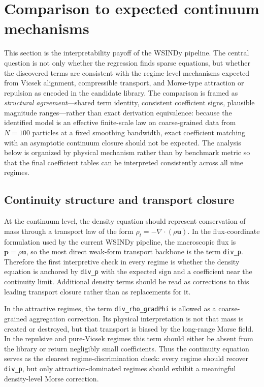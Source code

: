 \section{Comparison to expected continuum mechanisms}
\label{sec:continuum_comparison}

This section is the interpretability payoff of the WSINDy pipeline.  The
central question is not only whether the regression finds sparse equations, but
whether the discovered terms are consistent with the regime-level mechanisms
expected from Vicsek alignment, compressible transport, and Morse-type
attraction or repulsion as encoded in the candidate library.  The comparison
is framed as \emph{structural agreement}---shared term identity, consistent
coefficient signs, plausible magnitude ranges---rather than exact derivation
equivalence: because the identified model is an effective finite-scale law on
coarse-grained data from $N{=}100$ particles at a fixed smoothing bandwidth,
exact coefficient matching with an asymptotic continuum closure should not be
expected.
The analysis below is organized by physical mechanism rather than
by benchmark metric so that the final coefficient tables can be interpreted
consistently across all nine regimes.

\subsection{Continuity structure and transport closure}

At the continuum level, the density equation should represent conservation of
mass through a transport law of the form
$\rho_t = -\nabla\cdot(\rho \mathbf{u})$.
In the flux-coordinate formulation used by the current WSINDy pipeline, the
macroscopic flux is $\mathbf{p}=\rho\mathbf{u}$, so the most direct weak-form
transport backbone is the term \texttt{div\_p}.  Therefore the first
interpretive check in every regime is whether the density equation is anchored
by \texttt{div\_p} with the expected sign and a coefficient near the continuity
limit.  Additional density terms should be read as corrections to this leading
transport closure rather than as replacements for it.

In the attractive regimes, the term \texttt{div\_rho\_gradPhi} is allowed as a
coarse-grained aggregation correction.  Its physical interpretation is not that
mass is created or destroyed, but that transport is biased by the long-range
Morse field.  In the repulsive and pure-Vicsek regimes this term should either
be absent from the library or return negligibly small coefficients.  Thus the
continuity equation serves as the clearest regime-discrimination check: every
regime should recover \texttt{div\_p}, but only attraction-dominated regimes
should exhibit a meaningful density-level Morse correction.

